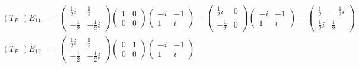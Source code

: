 \documentclass{article}
\DeclareMathOperator{\adj}{^\ast}
\begin{document}
\begin{align*}
    (T_{P\adj})E_{11} & = \begin{pmatrix}
                              \frac 1 2 i & \frac 1 2    \\
                              -\frac 1 2  & -\frac 1 2 i
                          \end{pmatrix} \begin{pmatrix}
                                            1 & 0 \\
                                            0 & 0
                                        \end{pmatrix} \begin{pmatrix}
                                                          -i & -1 \\
                                                          1  & i
                                                      \end{pmatrix}
    = \begin{pmatrix}
          \frac 1 2 i & 0 \\
          -\frac 1 2  & 0
      \end{pmatrix} \begin{pmatrix}
                        -i & -1 \\
                        1  & i
                    \end{pmatrix} =
    \begin{pmatrix}
        \frac 1 2   & -\frac 1 2 i \\
        \frac 1 2 i & \frac 1 2
    \end{pmatrix}                                       \\
    (T_{P\adj})E_{12} & = \begin{pmatrix}
                              \frac 1 2 i & \frac 1 2    \\
                              -\frac 1 2  & -\frac 1 2 i
                          \end{pmatrix} \begin{pmatrix}
                                            0 & 1 \\
                                            0 & 0
                                        \end{pmatrix} \begin{pmatrix}
                                                          -i & -1 \\
                                                          1  & i

\end{pmatrix}
\end{align*}
\end{document}
